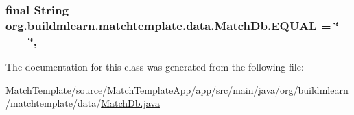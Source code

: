 \subsubsection[{\texorpdfstring{E\+Q\+U\+AL}{EQUAL}}]{\setlength{\rightskip}{0pt plus 5cm}final String org.\+buildmlearn.\+matchtemplate.\+data.\+Match\+Db.\+E\+Q\+U\+AL = \char`\"{} == \char`\"{}\hspace{0.3cm}{\ttfamily [static]}, {\ttfamily [private]}}\hypertarget{classorg_1_1buildmlearn_1_1matchtemplate_1_1data_1_1MatchDb_ad8c00c8127fb60c0d7f52f6d426f4792}{}\label{classorg_1_1buildmlearn_1_1matchtemplate_1_1data_1_1MatchDb_ad8c00c8127fb60c0d7f52f6d426f4792}


The documentation for this class was generated from the following file\+:\begin{DoxyCompactItemize}
\item 
Match\+Template/source/\+Match\+Template\+App/app/src/main/java/org/buildmlearn/matchtemplate/data/\hyperlink{MatchDb_8java}{Match\+Db.\+java}\end{DoxyCompactItemize}
